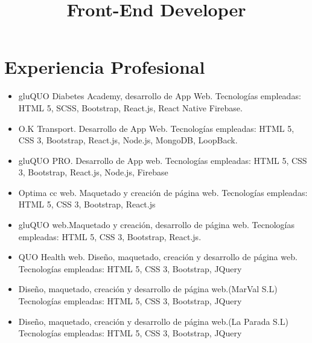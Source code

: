 \documentclass[11pt,a4paper]{moderncv}
\title{Front-End Developer}
\begin{document}
\maketitle
\section{Experiencia Profesional}
{\begin{itemize}
\item gluQUO Diabetes Academy, desarrollo de App Web. Tecnologías empleadas: HTML 5, SCSS, Bootstrap, React.js, React Native Firebase.
\item O.K Transport. Desarrollo de App Web. Tecnologías empleadas: HTML 5, CSS 3, Bootstrap, React.js, Node.js, MongoDB, LoopBack.
\item gluQUO PRO. Desarrollo de App web. Tecnologías empleadas: HTML 5, CSS 3, Bootstrap, React.js, Node.js, Firebase
\item Optima cc web. Maquetado y creación de página web. Tecnologías empleadas: HTML 5, CSS 3, Bootstrap, React.js
\item gluQUO web.Maquetado y creación, desarrollo de página web. Tecnologías empleadas: HTML 5, CSS 3, Bootstrap, React.js.
\item QUO Health web. Diseño, maquetado, creación y desarrollo de página web. Tecnologías empleadas: HTML 5, CSS 3, Bootstrap, JQuery
\end{itemize}
}
{
\begin{itemize}
\item Diseño, maquetado, creación y desarrollo de página web.(MarVal S.L) Tecnologías empleadas: HTML 5, CSS 3, Bootstrap, JQuery
\end{itemize}
\begin{itemize}
\item Diseño, maquetado, creación y desarrollo de página web.(La Parada S.L) Tecnologías empleadas: HTML 5, CSS 3, Bootstrap, JQuery
\end{itemize}
}
\end{document}
